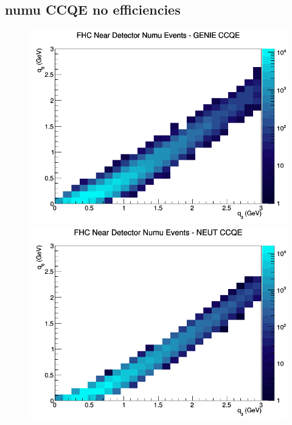 \documentclass[12pt]{article}
\begin{document}
\subsection{numu CCQE no efficiencies}
\begin{figure}[h]
\includegraphics[width=\linewidth]{q0_q3/nominal/CCQE_FHC_ND_numu_q3_q0_GENIE.png}
\endminipage
{}
\includegraphics[width=\linewidth]{q0_q3/nominal/CCQE_FHC_ND_numu_q3_q0_NEUT.png}
\endminipage
{}

\end{figure}
\end{document}
